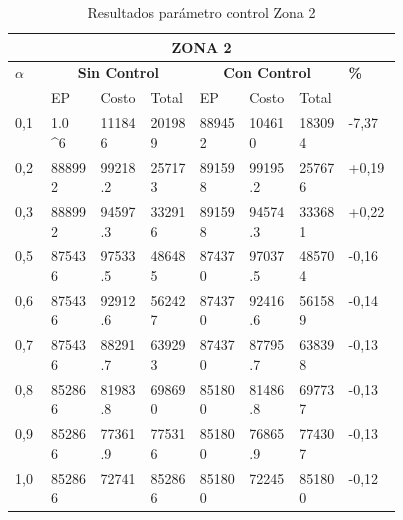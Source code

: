 \documentclass[conference]{IEEEtran}
\begin{document}
\begin{table*}[t]
\caption{Resultados par\'ametro control Zona 2}
\centering
\begin{tabular}{|p{0.03\linewidth}|p{0.06\linewidth}|p{0.06\linewidth}|p{0.06\linewidth}|p{0.06\linewidth}|p{0.06\linewidth}|p{0.06\linewidth}|p{0.06\linewidth}|}
\hline
\multicolumn{8}{|c|}{\textbf{ZONA 2}} \\ 
\hline

\multirow{2}{*}{\textbf{$\alpha$}}  & \multicolumn{3}{|c|}{\textbf{Sin Control}} & \multicolumn{3}{|c|}{\textbf{Con Control}} &  \multirow{2}{*}{\textbf{\%}} \\

\cline{2-7}
 & EP & Costo & Total & EP & Costo & Total &  \\
\hline
0,1 & 1.0 \cdot 10^6 & 111846 & 201989 & 889452 & 104610 & 183094 & -7,37 \\ 
\hline
0,2 & 888992 & 99218.2 & 257173 & 891598 & 99195.2 & 257676 & +0,19 \\
\hline
0,3 & 888992 & 94597.3 & 332916 & 891598 & 94574.3 & 333681 & +0,22 \\
\hline 
0,5 & 875436 & 97533.5 & 486485 & 874370 & 97037.5 & 485704 & -0,16 \\ 
\hline
0,6 & 875436 & 92912.6 & 562427 & 874370 & 92416.6 & 561589 & -0,14 \\ 
\hline
0,7 &  875436 & 88291.7 & 639293 & 874370 & 87795.7 & 638398 & -0,13 \\ 
\hline
0,8 & 852866 & 81983.8 & 698690 & 851800 & 81486.8 & 697737 & -0,13 \\ 
\hline
0,9 & 852866 & 77361.9 & 775316 & 851800 & 76865.9 & 774307 & -0,13 \\ 
\hline
1,0 & 852866 & 72741 & 852866 & 851800 & 72245 & 851800 & -0,12 \\ 
\hline 
\end{tabular}
\end{table*}
\end{document}

